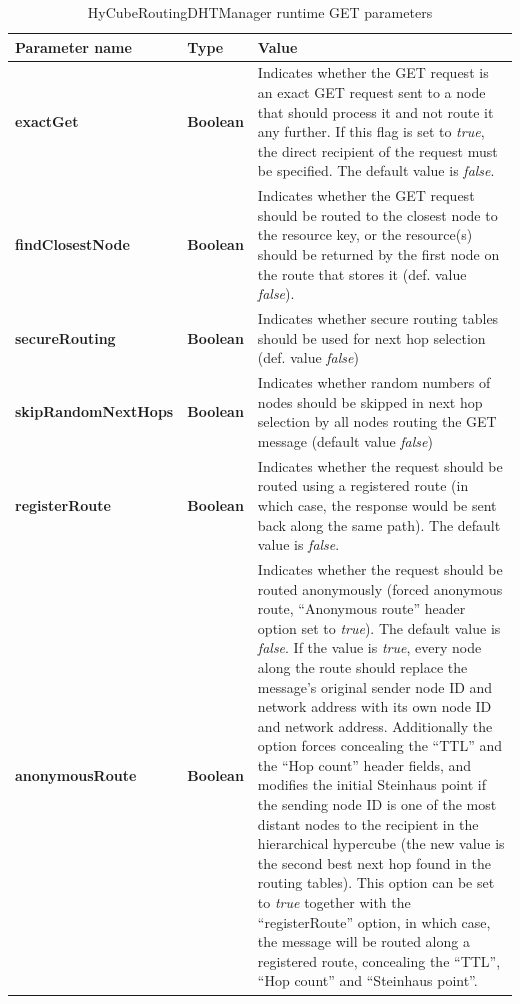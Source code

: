 \begin{table}
\scriptsize
\begin{center}
\begin{tabular}{p{2.5cm} p{1.5cm} p{10.5cm}}
	\hline
	\textbf{Parameter name}					& \textbf{Type}					& \textbf{Value}					\\[1mm]
    \hline
	\textbf{exactGet}						& \textbf{Boolean}				& Indicates whether the GET request is an exact GET request sent to a node that should process it and not route it any further. If this flag is set to \emph{true}, the direct recipient of the request must be specified.	The default value is \emph{false}.		\\[1.5mm]
	\textbf{findClosestNode}				& \textbf{Boolean}				& Indicates whether the GET request should be routed to the closest node to the resource key, or the resource(s) should be returned by the first node on the route that stores it (def. value \emph{false}).				\\[1.5mm]
	\textbf{secureRouting}					& \textbf{Boolean}				& Indicates whether secure routing tables should be used for next hop selection (def. value \emph{false})				\\[1.5mm]
	\textbf{skipRandomNextHops}				& \textbf{Boolean}				& Indicates whether random numbers of nodes should be skipped in next hop selection by all nodes routing the GET message (default value \emph{false})		\\[1.5mm]
	\textbf{registerRoute}					& \textbf{Boolean}				& Indicates whether the request should be routed using a registered route (in which case, the response would be sent back along the same path). The default value is \emph{false}.		\\[1.5mm]
	\textbf{anonymousRoute}					& \textbf{Boolean}				& Indicates whether the request should be routed anonymously (forced anonymous route, ``Anonymous route'' header option set to \emph{true}). The default value is \emph{false}. If the value is \emph{true}, every node along the route should replace the message's original sender node ID and network address with its own node ID and network address. Additionally the option forces concealing the ``TTL'' and the ``Hop count'' header fields, and modifies the initial Steinhaus point if the sending node ID is one of the most distant nodes to the recipient in the hierarchical hypercube (the new value is the second best next hop found in the routing tables). This option can be set to \emph{true} together with the ``registerRoute'' option, in which case, the message will be routed along a registered route, concealing the ``TTL'', ``Hop count'' and ``Steinhaus point''.		\\[1.5mm]
    \hline
\end{tabular}
\end{center}
\caption{HyCubeRoutingDHTManager runtime GET parameters}
\label{tab:HyCubeRoutingDHTManagerGetParameters}
\end{table}

